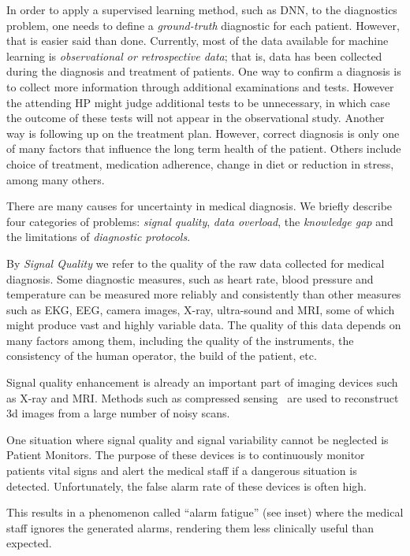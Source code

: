 \documentclass[11pt]{pnas-new}
\begin{document}
In order to apply a supervised learning method, such as  DNN, to the
diagnostics problem, one needs to define a {\em ground-truth} diagnostic for each
patient. However, that is easier said than done. Currently, most of
the data available for machine learning is {\em observational or
retrospective data}; that is, data has been collected
during the diagnosis and treatment of patients.
One way to confirm a diagnosis is to collect more information through
additional examinations and tests. However the attending HP might
judge additional tests to be unnecessary, in which case the outcome of these tests will not
appear in the observational study.
Another way is following up on the treatment plan. However, correct
diagnosis is only one of many factors that influence the long term
health of the patient. Others include choice of treatment, medication
adherence, change in diet or reduction in stress, among many others.

There are many causes for uncertainty in medical diagnosis. We briefly
describe four categories of problems: {\em signal quality}, {\em data
  overload}, the {\em knowledge gap} and the limitations of {\em
  diagnostic protocols}.

 
By {\em Signal Quality} we refer to the quality of the raw data
collected for medical diagnosis. Some diagnostic measures, such
as heart rate, blood pressure and temperature can be measured more reliably
and consistently than other
measures such as EKG, EEG, camera images, X-ray, ultra-sound and MRI, some of which might
produce vast and highly variable data. The quality of this data
depends on many factors among them, including the quality of the instruments, the
consistency of the human operator, the build of the patient, etc.

Signal quality enhancement is already an
important part of imaging devices such as X-ray and MRI. Methods such
as compressed sensing~\cite{lustig2008compressed} are used to
reconstruct 3d images from a large number of noisy scans.

One situation where signal quality and signal variability cannot be
neglected is Patient Monitors.  The purpose of these devices is to
continuously monitor patients vital signs and alert the medical staff
if a dangerous situation is detected. Unfortunately, the false alarm
rate of these devices is often high.

This results in a phenomenon
called ``alarm fatigue'' (see inset) where the medical staff ignores
the generated alarms, rendering them less clinically useful than
expected.
\end{document}
